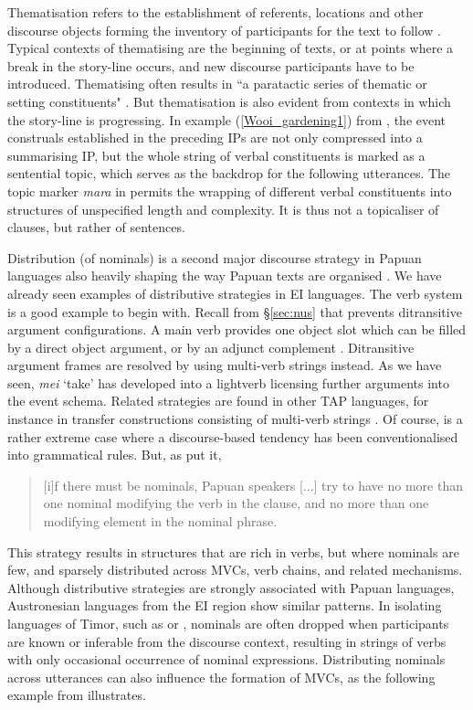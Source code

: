 Thematisation refers to the establishment of referents, locations and other discourse objects forming the inventory of participants for the text to follow \citep{heeschen1998eipo, devries2006areal}. Typical contexts of thematising are the beginning of texts, or at points where a break in the story-line occurs, and new discourse participants have to be introduced. Thematising often results in ``a paratactic series of thematic or setting constituents" \citep[814]{devries2006areal}. But thematisation is also evident from contexts  in which the story-line is progressing. In example (\ref{Wooi_gardening1}) from , the event construals established in the preceding IPs are not only compressed into a summarising IP, but the whole string of verbal constituents is marked as a sentential topic, which serves as the backdrop for the following utterances. The topic marker \textit{mara} in  permits the wrapping of different verbal constituents into structures of unspecified length and complexity. It is thus not a topicaliser of clauses, but rather of sentences.

Distribution (of nominals) is a second major discourse strategy in Papuan languages also heavily shaping the way Papuan texts are organised \citep{devries2005towards, devries2006areal}. We have already seen examples of distributive strategies in EI languages. The  verb system is a good example to begin with. Recall from §\ref{sec:nus} that  prevents ditransitive argument configurations. A main verb provides one object slot which can be filled by a direct object argument, or by an adjunct complement \citep{huber2011}. Ditransitive argument frames are resolved by using multi-verb strings instead. As we have seen, \textit{mei} `take' has developed into a lightverb licensing further arguments into the event schema. Related strategies are found in other TAP languages, for instance in transfer constructions consisting of multi-verb strings \citep{klamer2012development}. Of course,  is a rather extreme case where a discourse-based tendency has been conventionalised into grammatical rules. But, as \citet[813]{devries2006areal} put it, \begin{quote}[i]f there must be nominals, Papuan speakers [...] try to have no more than one nominal modifying the verb in the clause, and no more than one modifying element in the nominal phrase.\end{quote} This strategy results in structures that are rich in verbs, but where nominals are few, and sparsely distributed across MVCs, verb chains, and related mechanisms. Although distributive strategies are strongly associated with Papuan languages, Austronesian languages from the EI region show similar patterns. In isolating languages of Timor, such as  or , nominals are often dropped when participants are known or inferable from the discourse context, resulting in strings of verbs with only occasional occurrence of nominal expressions. Distributing nominals across utterances can also influence the formation of MVCs, as the following example from  illustrates.

